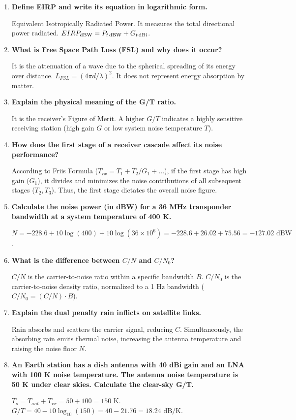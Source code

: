 \documentclass[12pt,a4paper]{article}
\newcommand{\Q}[1]{\textbf{#1}\par\noindent\ignorespaces}
\begin{document}
\begin{tcolorbox}[exambox, title={\textbf{Frequently Asked / Viva Questions}}]
\begin{enumerate}[topsep=0pt, label=\textbf{Q\arabic*.}, itemsep=5pt]
  \item \Q{Define EIRP and write its equation in logarithmic form.}
    Equivalent Isotropically Radiated Power. It measures the total directional power radiated. $EIRP_{\text{dBW}} = P_{t\text{\,dBW}} + G_{t\text{\,dBi}}$.
  \item \Q{What is Free Space Path Loss (FSL) and why does it occur?}
    It is the attenuation of a wave due to the spherical spreading of its energy over distance. $L_{FSL} = (4\pi d/\lambda)^2$. It does not represent energy absorption by matter.
  \item \Q{Explain the physical meaning of the G/T ratio.}
    It is the receiver's Figure of Merit. A higher $G/T$ indicates a highly sensitive receiving station (high gain $G$ or low system noise temperature $T$).
  \item \Q{How does the first stage of a receiver cascade affect its noise performance?}
    According to Friis Formula ($T_{rx} = T_1 + T_2/G_1 + \dots$), if the first stage has high gain ($G_1$), it divides and minimizes the noise contributions of all subsequent stages ($T_2, T_3$). Thus, the first stage dictates the overall noise figure.
  \item \Q{Calculate the noise power (in dBW) for a 36 MHz transponder bandwidth at a system temperature of 400 K.}
    $N = -228.6 + 10\log(400) + 10\log(36 \times 10^6) = -228.6 + 26.02 + 75.56 = -127.02 \text{ dBW}$.
  \item \Q{What is the difference between $C/N$ and $C/N_0$?}
    $C/N$ is the carrier-to-noise ratio within a specific bandwidth $B$. $C/N_0$ is the carrier-to-noise density ratio, normalized to a 1 Hz bandwidth ($C/N_0 = (C/N) \cdot B$).
  \item \Q{Explain the dual penalty rain inflicts on satellite links.}
    Rain absorbs and scatters the carrier signal, reducing $C$. Simultaneously, the absorbing rain emits thermal noise, increasing the antenna temperature and raising the noise floor $N$.
  \item \Q{An Earth station has a dish antenna with 40 dBi gain and an LNA with 100 K noise temperature. The antenna noise temperature is 50 K under clear skies. Calculate the clear-sky G/T.}
    $T_s = T_{ant} + T_{rx} = 50 + 100 = 150 \text{ K}$. $G/T = 40 - 10\log_{10}(150) = 40 - 21.76 = 18.24 \text{ dB/K}$.

\end{enumerate}
\end{tcolorbox}
\end{document}
